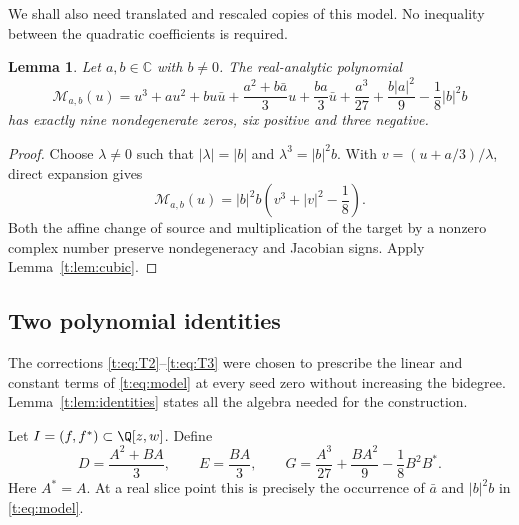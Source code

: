 \documentclass[UTF8,11pt]{ctexart}
\newtheorem{lem}[thm]{Lemma}
\theoremstyle{definition}
\numberwithin{equation}{section}
\newcommand{\C}{\mathbb C}\newcommand{\R}{\mathbb R}
\begin{document}
We shall also need translated and rescaled copies of this model. No
inequality between the quadratic coefficients is required.
\begin{lem}\label{t:lem:translated}
Let $a,b\in\C$ with $b\ne0$. The real-analytic polynomial
\begin{equation}\label{t:eq:model}
 \mathcal M_{a,b}(u)
 =u^3+au^2+bu\bar u
 +\frac{a^2+b\bar a}{3}u+\frac{ba}{3}\bar u
 +\frac{a^3}{27}+\frac{b|a|^2}{9}-\frac18|b|^2b
\end{equation}
has exactly nine nondegenerate zeros, six positive and three negative.
\end{lem}
\begin{proof}
Choose $\lambda\ne0$ such that $|\lambda|=|b|$ and
$\lambda^3=|b|^2b$. With $v=(u+a/3)/\lambda$, direct expansion gives
\[
 \mathcal M_{a,b}(u)=|b|^2b\left(v^3+|v|^2-\frac18\right).
\]
Both the affine change of source and multiplication of the target by
a nonzero complex number preserve nondegeneracy and Jacobian signs.
Apply Lemma~\ref{t:lem:cubic}.
\end{proof}

\subsection{Two polynomial identities}\label{t:sec:identities}

The corrections \eqref{t:eq:T2}--\eqref{t:eq:T3} were chosen to prescribe
the linear and constant terms of \eqref{t:eq:model} at every seed zero
without increasing the bidegree. Lemma~\ref{t:lem:identities} states all the algebra needed for the
construction.

Let $I=(f,f^*)\subset\Q[z,w]$. Define
\begin{equation}\label{t:eq:targetcoeffs}
 D=\frac{A^2+BA}{3},\qquad E=\frac{BA}{3},\qquad
 G=\frac{A^3}{27}+\frac{BA^2}{9}-\frac18B^2B^*.
\end{equation}
Here $A^*=A$. At a real slice point this is precisely the occurrence
of $\bar a$ and $|b|^2b$ in \eqref{t:eq:model}.
\end{document}
